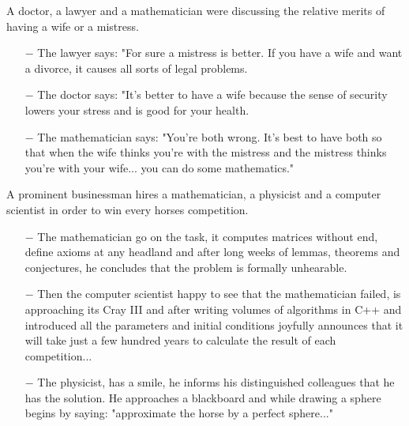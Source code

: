 \begin{center}\underline{\hspace{5 cm}}\end{center}

A doctor, a lawyer and a mathematician were discussing the relative merits of having a wife or a mistress.
\begin{itemize}	 
	\item[$-$] The lawyer says: "For sure a mistress is better. If you have a wife and want a divorce, it causes all sorts of legal problems.

	\item[$-$] The doctor says: "It's better to have a wife because the sense of security lowers your stress and is good for your health.

	\item[$-$] The mathematician says: "You're both wrong. It's best to have both so that when the wife thinks you're with the mistress and the mistress thinks you're with your wife... you can do some mathematics."
\end{itemize}

\begin{center}\underline{\hspace{5 cm}}\end{center}

A prominent businessman hires a mathematician, a physicist and a computer scientist in order to win every horses competition.
\begin{itemize}	 
	\item[$-$] The mathematician go on the task, it computes matrices without end, define axioms at any headland and after long weeks of lemmas, theorems and conjectures, he concludes that the problem is formally unhearable.

	\item[$-$] Then the computer scientist happy to see that the mathematician failed, is approaching its Cray III and after writing volumes of algorithms in C++ and introduced all the parameters and initial conditions joyfully announces that it will take just a few hundred years to calculate the result of each competition...

	\item[$-$] The physicist, has a smile, he informs his distinguished colleagues that he has the solution. He approaches a blackboard and while drawing a sphere begins by saying: "approximate the horse by a perfect sphere..."
\end{itemize}


